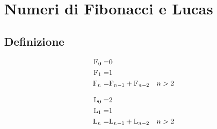 \chapter{Numeri di Fibonacci e Lucas}
\section{Definizione}
\begin{defn}
	\begin{align}
		\mathrm{F}_{0}=&{}0\notag\\
		\mathrm{F}_{1}=&{}1\notag\\
		\mathrm{F}_{n}=&{}\mathrm{F}_{n-1}+\mathrm{F}_{n-2}\quad n>2\label{eqn:Fibodef}
	\end{align}
\end{defn}
\begin{defn}
	\begin{align}
		\mathrm{L}_{0}=&{}2\notag\\
		\mathrm{L}_{1}=&{}1\notag\\
		\mathrm{L}_{n}=&{}\mathrm{L}_{n-1}+\mathrm{L}_{n-2}\quad n>2\label{eqn:Lucadef}
	\end{align}
\end{defn}
